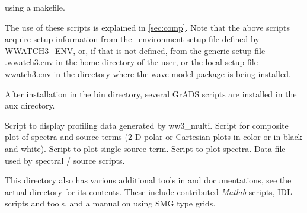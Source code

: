 \begin{flist}
{                        using a makefile.}
\end{flist}

\noindent
The use of these scripts is explained in \para\ref{sec:comp}.  Note that the
above scripts acquire setup information from the \ws\ environment setup file
defined by {\code WWATCH3\_ENV}, or, if that is not defined, from the generic 
setup file {\file .wwatch3.env} in the home directory of the user, or the local 
setup file {\file wwatch3.env} in the directory where the wave model package is 
being installed.

\noindent
After installation in the {\dir bin} directory, several GrADS scripts are
installed in the {\dir aux} directory.

\begin{flist}
      {Script to display profiling data generated by {\file
                       ww3\_multi}.} 
       {Script for composite plot of spectra and source
                       terms (2-D polar or Cartesian plots in color or in
                       black and white).}
      {Script to plot single source term.}
         {Script to plot spectra.}
   {Data file used by spectral / source scripts.}
\end{flist}

\noindent
This directory also has various additional tools in and documentations, see
the actual directory for its contents. These include contributed {\it Matlab} scripts,
{\file IDL} scripts and tools, and a manual on using {\file SMG type} grids.

